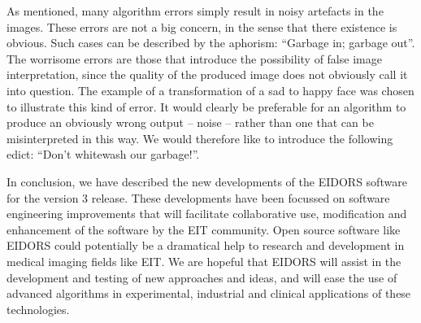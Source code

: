 \documentclass[12pt]{iopart}
\begin{document}
As mentioned, many algorithm errors simply result in 
noisy artefacts in the images. These errors are not a big
concern, in the sense that there existence is obvious.
Such cases can be described by the aphorism:
``Garbage in; garbage out''.
The worrisome errors are those that introduce the possibility
of false image interpretation, since the quality of the
produced image does not obviously call it into question.
The example of a transformation of a sad to happy face 
was chosen to illustrate this kind of error. It would
clearly be preferable for an algorithm to produce an
obviously wrong output -- noise -- rather than one
that can be misinterpreted in this way. We would therefore like
to introduce the following edict: 
``Don't whitewash our garbage!''.


In conclusion, we have described the new
developments of the EIDORS software for the
version 3 release. These developments have been 
focussed on software engineering improvements that
will facilitate collaborative use, modification and
enhancement of the software by the EIT community.
Open source software like EIDORS could
potentially be a dramatical help to
research and development in medical imaging fields like EIT.
We are hopeful that EIDORS will assist in the development
and testing of new approaches and ideas, and will
ease the use of advanced algorithms in experimental,
industrial and clinical applications of these technologies.
\end{document}
